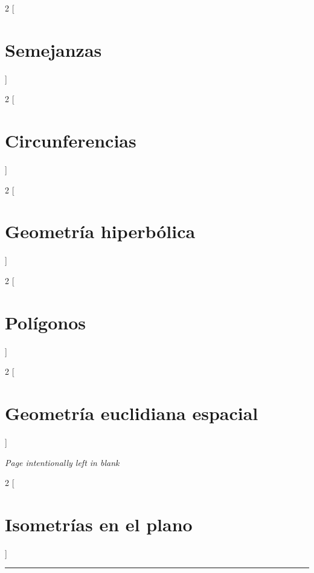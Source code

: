 \documentclass[a4paper, ]{article}
\begin{document}
	\begin{multicols*}{2}
	[\section{Semejanzas}]
	\end{multicols*}\pagebreak
	
	\begin{multicols*}{2}
	[\section{Circunferencias}]
	\end{multicols*}\pagebreak
	
	\begin{multicols*}{2}
	[\section{Geometría hiperbólica}]
	\end{multicols*}\pagebreak
	
	\begin{multicols*}{2}
	[\section{Polígonos}]
	\end{multicols*}\pagebreak
	
	\begin{multicols*}{2}
	[\section{Geometría euclidiana espacial}]
	\end{multicols*}\pagebreak
	
	\pagebreak
	\textcolor{gris}{\textit{Page intentionally left in blank}}
	\newpage
	\pagebreak
	
	\begin{multicols*}{2}
	[\section{Isometrías en el plano}]
	\end{multicols*}\pagebreak
	
	
	 \noindent\rule{\linewidth}{0.4pt}
	 \doclicenseThis
	 
	 
	 
	 
	 
	 
	 
	 
	  	
 	
 	
 	
 	
 	
\end{document}
